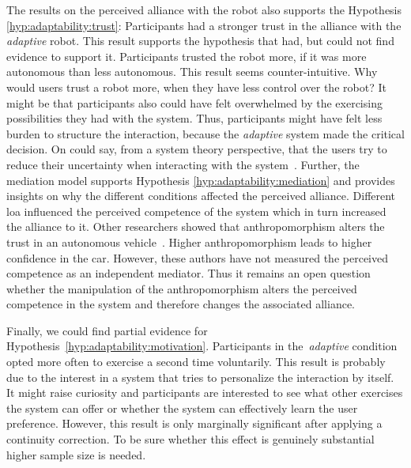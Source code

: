 \documentclass[twocolumn]{svjour3}          %
\begin{document}
The results on the perceived alliance with the robot
also supports the Hypothesis \ref{hyp:adaptability:trust}: Participants had a
stronger trust in the alliance with the \textit{adaptive} robot. This result supports the
hypothesis that \textcite{rau2013effects} had, but could not find
evidence to support it. Participants trusted the robot more, if it was
more autonomous than less autonomous. This result seems
counter-intuitive. Why would users trust a robot more, when they
have less control over the robot? It might be that participants also
could have felt overwhelmed by the exercising possibilities they had
with the system. Thus, participants might have felt less burden to
structure the interaction, because the \textit{adaptive} system made the critical
decision. On could say, from a system theory perspective, that the users try to reduce their uncertainty when interacting with the system~\cite{Luhmann2000}. Further, the mediation model supports Hypothesis \ref{hyp:adaptability:mediation} and provides insights on why
the different conditions affected the perceived alliance. Different \gls{loa}
influenced the perceived competence of the system which in turn
increased the alliance to it.
Other researchers showed that anthropomorphism alters the trust in an
autonomous vehicle~\autocite{waytz2014mind}. Higher anthropomorphism
leads to higher confidence in the car. However, these authors have not
measured the perceived competence as an independent mediator. Thus it
remains an open question whether the manipulation of the
anthropomorphism alters the perceived competence in the system and
therefore changes the associated alliance.


Finally, we could find partial evidence for Hypothesis~\ref{hyp:adaptability:motivation}. Participants in the~\textit{adaptive} condition opted more often to exercise a second time voluntarily. This result is probably due to the interest in a system that tries to
personalize the interaction by itself. It might raise curiosity and participants are interested to see what other exercises the system can offer or whether the system can effectively learn the user preference. However, this result is only marginally significant after applying a continuity correction. To be sure whether this effect is genuinely
substantial higher sample size is needed.
\end{document}
